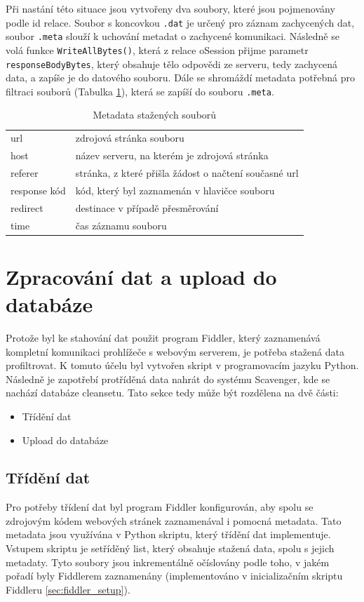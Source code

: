 \documentclass[thesis=M,czech,hidelinks]{FITthesis}[2013/05/06]
\begin{document}
Při nastání této situace jsou vytvořeny dva soubory, které jsou pojmenovány podle id relace. Soubor s koncovkou \texttt{.dat} je určený pro záznam zachycených dat, soubor \texttt{.meta} slouží k uchování metadat o zachycené komunikaci. Následně se volá funkce \texttt{WriteAllBytes()}, která z relace oSession přijme parametr \texttt{responseBodyBytes}, který obsahuje tělo odpovědi ze serveru, tedy zachycená data, a zapíše je do datového souboru. Dále se shromáždí metadata potřebná pro filtraci souborů (Tabulka \ref{fig:meta}), která se zapíší do souboru \texttt{.meta}. 


\begin{table}[h]
	
	\centering
	\begin{tabular}{ll}
		url         	&  zdrojová stránka souboru \\
		host        	&  název serveru, na kterém je zdrojová stránka \\
		referer       	&  stránka, z které přišla žádost o načtení současné url \\
		response kód   	&  kód, který byl zaznamenán v hlavičce souboru  \\
		redirect		&  destinace v případě přesměrování \\
		time			&  čas záznamu souboru
	\end{tabular}
	
	\caption{Metadata stažených souborů}
	\label{fig:meta}
\end{table}



\section{Zpracování dat a upload do databáze}
Protože byl ke stahování dat použit program Fiddler, který zaznamenává kompletní komunikaci prohlížeče s webovým serverem, je potřeba stažená data profiltrovat. K tomuto účelu byl vytvořen skript v programovacím jazyku Python. Následně je zapotřebí protříděná data nahrát do systému Scavenger, kde se nachází databáze cleansetu. Tato sekce tedy může být rozdělena na dvě části:
\begin{itemize}
	\item Třídění dat
	\item Upload do databáze
\end{itemize}



\subsection{Třídění dat}\label{sec:trideni}
Pro potřeby třídení dat byl program Fiddler konfigurován, aby spolu se zdrojovým kódem webových stránek zaznamenával i pomocná metadata. Tato metadata jsou využívána v Python skriptu, který třídění dat implementuje. Vstupem skriptu je setříděný list, který obsahuje stažená data, spolu s jejich metadaty. Tyto soubory jsou inkrementálně očíslovány podle toho, v jakém pořadí byly Fiddlerem zaznamenány (implementováno v inicializačním skriptu Fiddleru \ref{sec:fiddler_setup}).
\end{document}

